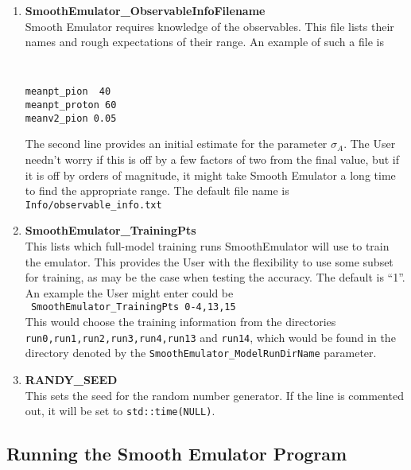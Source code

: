 \documentclass[main.tex]{subfiles}
\begin{document}
\begin{enumerate}
\item {\bf SmoothEmulator\_ObservableInfoFilename}\\
Smooth Emulator requires knowledge of the observables. This file lists their names and rough expectations of their range. An example of such a file is
{\tt
\begin{verbatim}
meanpt_pion  40
meanpt_proton 60
meanv2_pion 0.05
\end{verbatim}
}
The second line provides an initial estimate for the parameter $\sigma_A$. The User needn't worry if this is off by a few factors of two from the final value, but if it is off by orders of magnitude, it might take Smooth Emulator a long time to find the appropriate range. The default file name is {\tt Info/observable\_info.txt}
\item {\bf SmoothEmulator\_TrainingPts}\\
This lists which full-model training runs SmoothEmulator will use to train the emulator. This provides the User with the flexibility to use some subset for training, as may be the case when testing the accuracy. The default is ``1''. An example the User might enter could be\\
{\tt ~SmoothEmulator\_TrainingPts  0-4,13,15}\\
This would choose the training information from the directories {\tt run0,run1,run2,run3,run4,run13} and {\tt run14}, which would be found in the directory denoted by the {\tt SmoothEmulator\_ModelRunDirName} parameter.
\item {\bf RANDY\_SEED}\\
This sets the seed for the random number generator. If the line is commented out, it will be set to {\tt std::time(NULL)}.

\end{enumerate}
\subsection{Running the Smooth Emulator Program}
\end{document}
